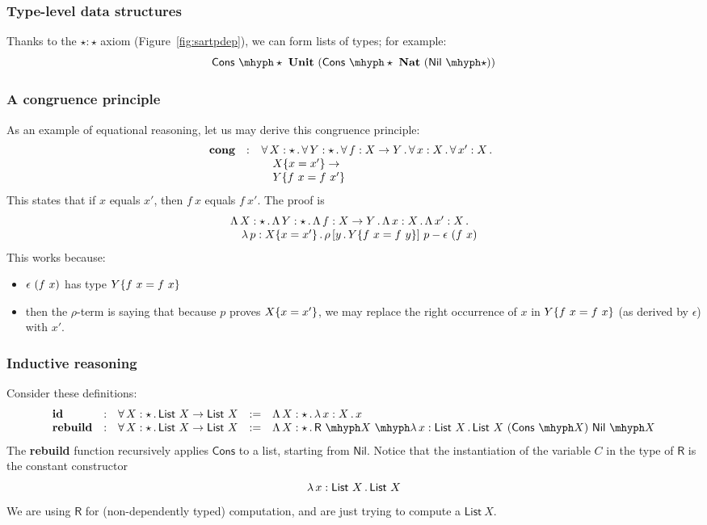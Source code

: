 \documentclass{article}
\begin{document}
\subsubsection{Type-level data structures}

Thanks to the $\star : \star$ axiom (Figure~\ref{fig:sartpdep}), we can form lists of types; for example:
\[
\appe{\mathsf{Cons}}{\star}\ \textbf{Unit}\ (\appe{\mathsf{Cons}}{\star}\ \textbf{Nat}\ (\appe{\mathsf{Nil}}{\star}))
\]

\subsubsection{A congruence principle}

As an example of equational reasoning, let us may derive this congruence principle:
\[
\begin{array}{lll}
\textbf{cong} & : & \allt{X}{\star}{\allt{Y}{\star}{\allt{f}{X \to Y}{\allt{x}{X}{\allt{x'}{X}{\ }}}}} \\
\ &\ &\ \ \ \eqtm{x}{X}{x'} \to \\
\ &\ &\ \ \ \eqtm{f\ x}{Y}{f\ x'}
\end{array}
\]
\noindent This states that if $x$ equals $x'$, then $f\ x$ equals $f\ x'$. The proof is 
\[
\begin{array}{l}
\Tlam{X}{\star}{\Tlam{Y}{\star}{\Tlam{f}{X \to Y}{\Tlam{x}{X}{\Tlam{x'}{X}{\ }}}}} \\
\ \ \ \tlam{p}{\eqtm{x}{X}{x'}}{\cng{y}{\eqtm{f\ x}{Y}{f\ y}}{p}{\rfl{(f\ x)}}}
\end{array}
\]
\noindent This works because:
\begin{itemize}
\item $\rfl{(f\ x)}$ has type $\eqtm{f\ x}{Y}{f\ x}$
\item then the $\rho$-term is saying that because $p$ proves $\eqtm{x}{X}{x'}$,
  we may replace the right occurrence of $x$ in $\eqtm{f\ x}{Y}{f\ x}$ (as derived by $\epsilon$) with $x'$.
  \end{itemize}

\subsubsection{Inductive reasoning}

Consider these definitions:
\[
\begin{array}{lllll}
  \textbf{id} & : & \allt{X}{\star}{\mathsf{List}\ X \to \mathsf{List}\ X} & := & \Tlam{X}{\star}{\tlam{x}{X}{x}} \\
  
  \textbf{rebuild} & : & \allt{X}{\star}{\mathsf{List}\ X \to \mathsf{List}\ X} & := & \Tlam{X}{\star}{\appe{\appe{\mathsf{R}}{X}}{\tlam{x}{\mathsf{List}\ X}{\mathsf{List}\ X}}\ (\appe{\mathsf{Cons}}{X})\ \appe{\mathsf{Nil}}{X}}
  \end{array}
\]
\noindent The \textbf{rebuild} function recursively applies
$\mathsf{Cons}$ to a list, starting from $\mathsf{Nil}$.  Notice that the instantiation of the variable $C$ in the type of $\mathsf{R}$ is
the constant constructor
\[
\tlam{x}{\mathsf{List}\ X}{\mathsf{List}\ X}
\]
\noindent We are using $\mathsf{R}$ for
(non-dependently typed) computation, and are just trying to compute a
$\mathsf{List}\ X$.
\end{document}
